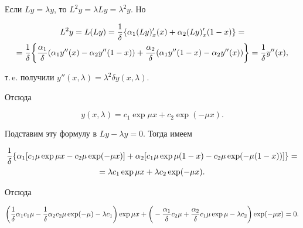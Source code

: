 \begin{pf}


Если $Ly=\lambda y$, то $L^2y=\lambda Ly=\lambda^2y$. Но


\begin{multline*}


L^2y=L(Ly)=\frac{\di 1}{\delta}\{\alpha_1(Ly)'_x(x)+


\alpha_2(Ly)'_x(1-x)\}= \\


%


=\frac{\di 1}{\delta}\bigg\{\frac{\di\alpha_1}{\delta}(\alpha_1y''(x)-


\alpha_2y''(1-x))+\frac{\di\alpha_2}{\delta}(\alpha_1y''(1-x)-


\alpha_2y''(x))\bigg\}=\frac{\di 1}{\delta}y''(x),


\end{multline*}


т.\,e. получили $y''(x,\lambda)=\lambda^2\delta y(x,\lambda)$.


Отсюда


\begin{equation}


y(x,\lambda)=c_1\exp\mu x+c_2\exp(-\mu x).


\end{equation}


Подставим эту формулу в $Ly-\lambda y=0$. Тогда имеем


\begin{multline*}


{\di\frac1\delta\{\alpha_1[c_1\mu\exp\mu x-c_2\mu\exp(-\mu x)]+


\alpha_2[c_1\mu\exp\mu(1-x)-


c_2\mu\exp(-\mu(1- x))]\}=}\\


=\lambda c_1\exp\mu x+\lambda c_2\exp(-\mu x).


\end{multline*}


Отсюда


$$


\bigg(\di\frac1\delta\alpha_1c_1\mu-


\frac1\delta\alpha_2c_2\mu \exp(-\mu)-\lambda c_1\bigg)


\exp\mu x+


\di\bigg(-\frac{\alpha_1}\delta c_2\mu+\frac{\alpha_2}\delta c_1\mu\exp\mu-


\lambda c_2\bigg)\exp(-\mu x)=0.


$$



\end{pf}
